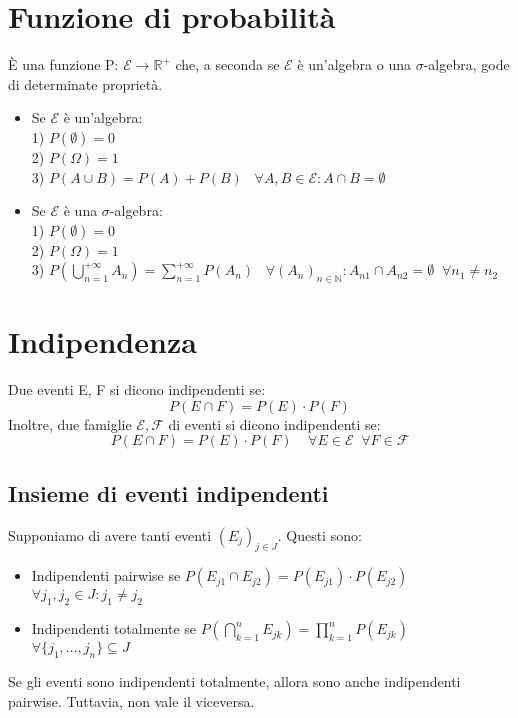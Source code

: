 \documentclass{article}
\begin{document}
\section*{Funzione di probabilità}
\`E una funzione P: $\mathcal{E} \to \mathbb{R}^+$ che, a seconda se $\mathcal{E}$ è un'algebra o una $\sigma$-algebra, gode di determinate proprietà.
\begin{itemize}
\item Se $\mathcal{E}$ è un'algebra:\\
	1) $P(\emptyset) = 0$\\
	2) $P(\Omega) = 1$\\
	3) $P(A\cup B) = P(A)+P(B) \; \; \; \forall A, B \in \mathcal{E} : A \cap B = \emptyset$
\item Se $\mathcal{E}$ è una $\sigma$-algebra:\\
	1) $P(\emptyset) = 0$\\
	2) $P(\Omega) = 1$\\
	3) $P(\bigcup_{n=1}^{+\infty}A_{n}) = \sum_{n=1}^{+\infty}P(A_{n}) \; \; \; \forall (A_{n})_{n \in \mathbb{N}} : A_{n1} \cap A_{n2} = \emptyset \; \; \forall n_{1} \neq n_{2}$
\end{itemize}

\section*{Indipendenza}
Due eventi E, F si dicono indipendenti se:
\[ P(E \cap F) = P(E)\cdot P(F) \]
Inoltre, due famiglie $\mathcal{E}, \mathcal{F}$ di eventi si dicono indipendenti se:
\[ P(E \cap F) = P(E)\cdot P(F) \; \; \; \; \forall E \in \mathcal{E} \; \; \forall F \in \mathcal{F} \]

\subsection*{Insieme di eventi indipendenti}
Supponiamo di avere tanti eventi $(E_{j})_{j\in J}$. Questi sono:
\begin{itemize}
\item Indipendenti pairwise se $P(E_{j1} \cap E_{j2}) = P(E_{j1})\cdot P(E_{j2})$\\
$\forall j_{1}, j_{2} \in J : j_{1} \neq j_{2}$
\item Indipendenti totalmente se $P(\bigcap_{k=1}^{n}E_{jk}) = \prod_{k=1}^{n}P(E_{jk})$\\
$\forall \{j_{1},...,j_{n}\} \subseteq J$
\end{itemize}
Se gli eventi sono indipendenti totalmente, allora sono anche indipendenti pairwise. Tuttavia, non vale il viceversa.
\end{document}
